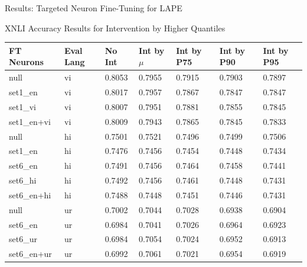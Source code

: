 \documentclass[aspectratio=169]{beamer}
\begin{document}
\begin{frame}{Results: Targeted Neuron Fine-Tuning for LAPE}
	\begin{block}{\scriptsize XNLI Accuracy Results for Intervention by Higher Quantiles}\scriptsize
		\begin{table}[ht]
			\centering
			\renewcommand{\arraystretch}{1.3}
			\setlength{\tabcolsep}{4pt}
			\begin{tabularx}{\textwidth}{|X|X|X|X|X|X|X|}
				\hline
				\textbf{FT Neurons} & \textbf{Eval Lang} & \textbf{No Int} & \textbf{Int by $\mu$} & \textbf{Int by P75} & \textbf{Int by P90} & \textbf{Int by P95} \\
				\hline
				null & vi & 0.8053 & 0.7955 & 0.7915 & 0.7903 & 0.7897 \\
				set1\_en & vi & 0.8017 & 0.7957 & 0.7867 & 0.7847 & 0.7847 \\
				set1\_vi & vi & 0.8007 & 0.7951 & 0.7881 & 0.7855 & 0.7845 \\
				set1\_en+vi & vi & 0.8009 & 0.7943 & 0.7865 & 0.7845 & 0.7833 \\
				\hline
				null & hi & 0.7501 & 0.7521 & 0.7496 & 0.7499 & 0.7506 \\
				set1\_en & hi & 0.7476 & 0.7456 & 0.7454 & 0.7448 & 0.7434 \\
				set6\_en & hi & 0.7491 & 0.7456 & 0.7464 & 0.7458 & 0.7441 \\
				set6\_hi & hi & 0.7492 & 0.7456 & 0.7461 & 0.7448 & 0.7431 \\
				set6\_en+hi & hi & 0.7488 & 0.7448 & 0.7451 & 0.7446 & 0.7431 \\
				\hline
				null & ur & 0.7002 & 0.7044 & 0.7028 & 0.6938 & 0.6904 \\
				set6\_en & ur & 0.6984 & 0.7041 & 0.7026 & 0.6964 & 0.6923 \\
				set6\_ur & ur & 0.6984 & 0.7054 & 0.7024 & 0.6952 & 0.6913 \\
				set6\_en+ur & ur & 0.6992 & 0.7061 & 0.7021 & 0.6954 & 0.6919 \\
				\hline
			\end{tabularx}
		\end{table}
	\end{block}
\end{frame}
	
\end{document}

